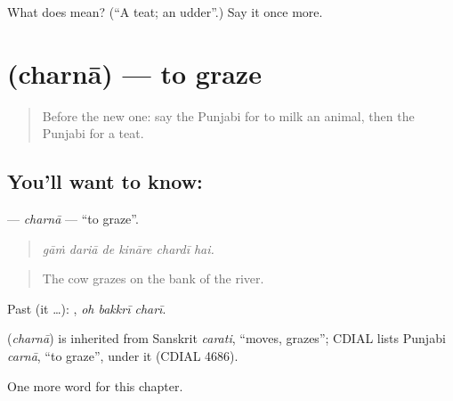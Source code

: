 \begin{tcolorbox}[breakable,colback=teal!4,colframe=teal!35!black,title={Before you move on}]
What does  mean? (\textquotedblleft{}A teat; an udder\textquotedblright{}.) Say it once more.
\end{tcolorbox}
\section[\texorpdfstring{\pa{ਚਰਨਾ} (charnā)}{ਚਰਨਾ (charnā)}]{ (charnā) — to graze}

\label{lesson:PA-C307-charna}



\begin{quote}
Before the new one: say the Punjabi for to milk an animal, then the Punjabi for a teat.
\end{quote}

\subsection*{You'll want to know: }
\textbf{} — \emph{charnā} — \textquotedblleft{}to graze\textquotedblright{}.

\begin{quote}
     
\end{quote}

\begin{quote}
\emph{gāṁ dariā de kināre chardī hai.}
\end{quote}

\begin{quote}
The cow grazes on the bank of the river.
\end{quote}

Past (it …):   , \emph{oh bakkrī charī}.

\begin{cousinweb}
\textbf{} (\emph{charnā}) is inherited from Sanskrit \emph{carati}, \textquotedblleft{}moves, grazes\textquotedblright{}; CDIAL lists Punjabi \emph{carnā}, \textquotedblleft{}to graze\textquotedblright{}, under it (CDIAL 4686).
\end{cousinweb}

\begin{grammarlens}[title={What you've built}]
One more word for this chapter.
\end{grammarlens}

